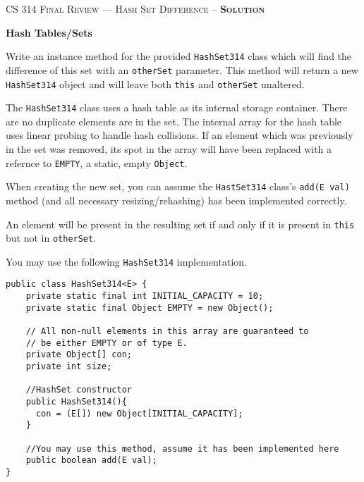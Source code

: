 \documentclass[12pt,letter]{article}
\begin{document}
\noindent\textsc{\large CS 314 Final Review --- Hash Set Difference -- \textbf{Solution}}

\vspace{6pt}
\noindent\textbf{Hash Tables/Sets}

\vspace{2pt}
\noindent Write an instance method for the provided \texttt{HashSet314} class which will find the difference of this set with an \texttt{otherSet} 
parameter. This method will return a new \texttt{HashSet314} object and will leave both \texttt{this} and \texttt{otherSet} unaltered. 

\vspace{2pt}

\noindent The \texttt{HashSet314} class uses a hash table as its internal storage container. There are no duplicate elements are in the set.
The internal array for the hash table uses linear probing to handle hash collisions. If an element which was previously in the set was removed, its spot
in the array will have been replaced with a refernce to \texttt{EMPTY}, a static, empty \texttt{Object}.

\vspace{2pt}

\noindent When creating the new set, you can assume the \texttt{HastSet314} class's \texttt{add(E val)} method (and all necessary resizing/rehashing) has been implemented correctly.

\vspace{2pt}

\noindent An element will be present in the resulting set if and only if it is present in \texttt{this} but not in \texttt{otherSet}.

\vspace{4pt}

\vspace{6pt}
\noindent You may use the following \texttt{HashSet314} implementation.
\begin{verbatim}
public class HashSet314<E> {
    private static final int INITIAL_CAPACITY = 10;
    private static final Object EMPTY = new Object();

    // All non-null elements in this array are guaranteed to 
    // be either EMPTY or of type E.
    private Object[] con;
    private int size;

    //HashSet constructor
    public HashSet314(){
      con = (E[]) new Object[INITIAL_CAPACITY];
    }

    //You may use this method, assume it has been implemented here
    public boolean add(E val);
}
\end{verbatim}
\end{document}
